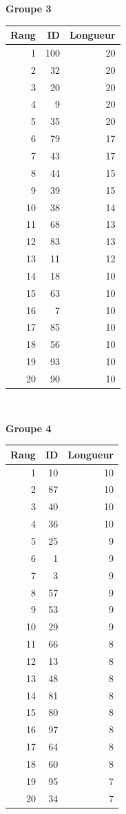 \documentclass[10pt]{article}
\begin{document}
\hfill
 \begin{minipage}[t]{0.31\textwidth}
\centering
\small
\textbf{Groupe 3}\\[-0.25em]
\begin{tabular}{@{}r r r@{}}
\toprule
Rang & ID & Longueur \\
\midrule
1 & 100 & 20 \\
2 & 32 & 20 \\
3 & 20 & 20 \\
4 & 9 & 20 \\
5 & 35 & 20 \\
6 & 79 & 17 \\
7 & 43 & 17 \\
8 & 44 & 15 \\
9 & 39 & 15 \\
10 & 38 & 14 \\
11 & 68 & 13 \\
12 & 83 & 13 \\
13 & 11 & 12 \\
14 & 18 & 10 \\
15 & 63 & 10 \\
16 & 7 & 10 \\
17 & 85 & 10 \\
18 & 56 & 10 \\
19 & 93 & 10 \\
20 & 90 & 10 \\
\bottomrule
\end{tabular}
\end{minipage}\\[0.8em]
\begin{minipage}[t]{0.31\textwidth}
\centering
\small
\textbf{Groupe 4}\\[-0.25em]
\begin{tabular}{@{}r r r@{}}
\toprule
Rang & ID & Longueur \\
\midrule
1 & 10 & 10 \\
2 & 87 & 10 \\
3 & 40 & 10 \\
4 & 36 & 10 \\
5 & 25 & 9 \\
6 & 1 & 9 \\
7 & 3 & 9 \\
8 & 57 & 9 \\
9 & 53 & 9 \\
10 & 29 & 9 \\
11 & 66 & 8 \\
12 & 13 & 8 \\
13 & 48 & 8 \\
14 & 81 & 8 \\
15 & 80 & 8 \\
16 & 97 & 8 \\
17 & 64 & 8 \\
18 & 60 & 8 \\
19 & 95 & 7 \\
20 & 34 & 7 \\
\bottomrule
\end{tabular}
\end{minipage} 
\end{document}
